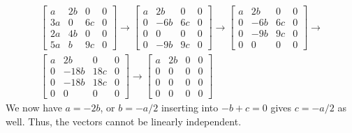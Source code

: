 \documentclass[a4paper,norsk,12pt]{article}
\begin{document}
\begin{align*}
  \left[
    \begin{array}{ccc|c}
       a & 2b &  0 & 0 \\
      3a &  0 & 6c & 0 \\
      2a & 4b &  0 & 0 \\
      5a &  b & 9c & 0
    \end{array}
  \right] \rightarrow
  \left[
    \begin{array}{ccc|c}
       a & 2b &  0 & 0 \\
       0 &-6b & 6c & 0 \\
       0 &  0 &  0 & 0 \\
       0 &-9b & 9c & 0
    \end{array}
  \right] \rightarrow
  \left[
    \begin{array}{ccc|c}
       a & 2b &  0 & 0 \\
       0 &-6b & 6c & 0 \\
       0 &-9b & 9c & 0 \\
       0 &  0 &  0 & 0
    \end{array}
  \right] 
  \rightarrow
  \\
  \left[
    \begin{array}{ccc|c}
       a &  2b &  0 & 0 \\
       0 &-18b & 18c & 0 \\
       0 &-18b & 18c & 0 \\
       0 &   0 &  0 & 0
    \end{array}
  \right]
  \rightarrow
  \left[
    \begin{array}{ccc|c}
       a &  2b &  0 & 0 \\
       0 &   0 &  0 & 0 \\
       0 &   0 &  0 & 0 \\
       0 &   0 &  0 & 0
    \end{array}
  \right]
\end{align*}
We now have $a=-2b$, or $b=-a/2$ inserting into $-b+c=0$ gives $c=-a/2$ as
well. Thus, the vectors cannot be linearly independent.
\end{document}
